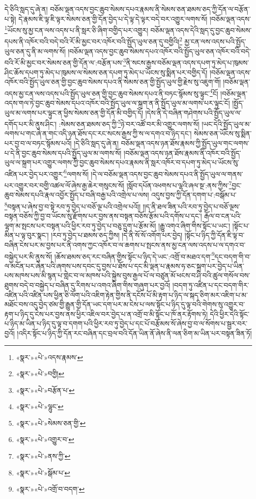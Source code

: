 དེ་ཅིའི་སླད་དུ་ཞེ་ན། བཅོམ་ལྡན་འདས་བྱང་ཆུབ་སེམས་དཔའ་རྣམས་ནི་སེམས་ཅན་ཐམས་ཅད་ཀྱི་དོན་ལ་བརྩོན་པ་སྟེ། དེ་རྣམས་ཇི་ལྟ་ཇི་ལྟར་སེམས་ཅན་གྱི་དོན་བྱེད་པ་དེ་ལྟ་དེ་ལྟར་བདེ་བར་འགྱུར་ལགས་སོ། །བཅོམ་ལྡན་འདས་\footnote{«སྣར་»«པེ་»འདས་རྣམས་}ཡོངས་སུ་མྱ་ངན་ལས་འདས་པ་ནི་སླར་ཅི་ཞིག་བགྱིད་པར་འགྱུར། བཅོམ་ལྡན་འདས་དེའི་སླད་དུ་བྱང་ཆུབ་སེམས་དཔས་ནི་འཁོར་བའི་བདེ་བའི་རོ་མི་མྱང་བར་འཁོར་བའི་སྤྱོད་ཡུལ་ཅན་དུ་བགྱིའི།\footnote{«སྣར་»«པེ་»བགྱི།} མྱ་ངན་ལས་འདས་པའི་སྤྱོད་ཡུལ་ཅན་དུ་ནི་མ་ལགས་སོ། །བཅོམ་ལྡན་འདས་བྱང་ཆུབ་སེམས་དཔའ་འཁོར་བའི་སྤྱོད་ཡུལ་ཅན་འཁོར་བའི་བདེ་བའི་རོ་མི་མྱང་བར་སེམས་ཅན་གྱི་དོན་ལ་:བརྩོན་པས་\footnote{«སྣར་»«པེ་»བརྩོན་པ་}ནི་སངས་རྒྱས་བཅོམ་ལྡན་འདས་དཔག་ཏུ་མེད་པ་ཁུམས་ཤིང་ཆོས་དཔག་ཏུ་མེད་པ་ཁུམས་ལ་སེམས་ཅན་དཔག་ཏུ་མེད་པ་ཡོངས་སུ་སྨིན་པར་བགྱིད་དོ། །བཅོམ་ལྡན་འདས་འཁོར་བའི་སྤྱོད་ཡུལ་ཅན་གྱི་བྱང་ཆུབ་སེམས་དཔའ་ནི་སེམས་ཅན་གྱི་སྤྱོད་ཡུལ་གྱི་རྗེས་སུ་འཇུག་གོ། །བཅོམ་ལྡན་འདས་མྱ་ངན་ལས་འདས་པའི་སྤྱོད་ཡུལ་ཅན་གྱི་བྱང་ཆུབ་སེམས་དཔའ་ནི་བཏང་སྙོམས་སུ་ལྟུང་\footnote{«སྣར་»«པེ་»ལྷུང་}ངོ། །བཅོམ་ལྡན་འདས་གལ་ཏེ་བྱང་ཆུབ་སེམས་དཔའ་འཁོར་བའི་སྤྱོད་ཡུལ་ལ་སྐྲག་ན་ནི་སྤྱོད་ཡུལ་མ་ལགས་པར་ལྟུང་ངོ། །སྤྱོད་ཡུལ་མ་ལགས་པར་ལྟུང་ན་ཕྱིས་སེམས་ཅན་གྱི་དོན་མི་བགྱིད་དོ། །དེས་ནི་དེ་བཞིན་གཤེགས་པའི་སྤྱོད་ཡུལ་ལ་དགོད་པར་མི་ནུས་ཤིང་། :སེམས་ཅན་ཐམས་ཅད་ཀྱི་\footnote{«སྣར་»«པེ་»སེམས་ཅན་གྱི་}ཉེ་བར་འཚོ་བར་མི་འགྱུར་ལགས་སོ། །ཡང་དེའི་སྤྱོད་ཡུལ་མ་ལགས་པ་གང་ཞེ་ན་གང་འདི་ཉན་ཐོས་དང་རང་སངས་རྒྱས་ཀྱི་ས་ལ་དགའ་བ་ཉིད་དང་། སེམས་ཅན་ཡོངས་སུ་སྨིན་པར་བྱ་བ་ལ་བཏང་སྙོམས་པའོ། །དེ་ཅིའི་སླད་དུ་ཞེ་ན། བཅོམ་ལྡན་འདས་ཉན་ཐོས་རྣམས་ཀྱི་སྤྱོད་ཡུལ་གང་ལགས་པ་དེ་ནི་བྱང་ཆུབ་སེམས་དཔའི་སྤྱོད་ཡུལ་མ་ལགས་སོ། །བཅོམ་ལྡན་འདས་ཉན་ཐོས་རྣམས་ནི་འཁོར་བའི་སྤྱོད་ཡུལ་ལ་སྐྲག་པར་འགྱུར་ལགས་ཀྱི་བྱང་ཆུབ་སེམས་དཔའ་རྣམས་ནི་སླར་འཁོར་བ་དཔག་ཏུ་མེད་པ་ཡོངས་སུ་འཛིན་པར་བྱེད་པར་འགྱུར་\footnote{«སྣར་»«པེ་»འགྱུར་བ་}ལགས་སོ། །དེ་ལ་བཅོམ་ལྡན་འདས་བྱང་ཆུབ་སེམས་དཔའ་ནི་སྤྱོད་ཡུལ་ལ་གནས་པར་འགྱུར་བར་བགྱི་འཚལ་ལོ་ཞེས་རྒྱ་ཆེར་གསུངས་སོ། །སློབ་དཔོན་འཕགས་པ་ལྷའི་ཞལ་སྔ་:ནས་ཀྱིས་\footnote{«སྣར་»«པེ་»ནས་ཀྱི་}བྱང་ཆུབ་སེམས་དཔའི་རྣལ་འབྱོར་སྤྱོད་པ་བཞི་བརྒྱ་པའི་འགྲེལ་པ་ལས། འདུས་བྱས་ཀྱི་དོན་དགག་པ་:བསྒོམ་པ་\footnote{«སྣར་»«པེ་»སྒོམ་པ་}བསྟན་པ་ཞེས་བྱ་བ་སྟེ་རབ་ཏུ་བྱེད་པ་བཅོ་ལྔ་པའི་འགྲེལ་པའོ།། །།ད་ནི་ཐལ་ཟིན་པའི་རབ་ཏུ་བྱེད་པ་བཅོ་ལྔས་བསྟན་བཅོས་ཀྱི་བྱ་བ་ཡོངས་སུ་རྫོགས་པར་བྱས་ནས་བསྟན་བཅོས་རྩོམ་པའི་དགོས་པ་དང་། རྒོལ་བ་ངན་པའི་ལྷག་མ་སྤངས་པར་བསྟན་པའི་ཕྱིར་རབ་ཏུ་བྱེད་པ་བཅུ་དྲུག་པ་རྩོམ་མོ། །རྒྱུ་འགའ་ཞིག་གིས་སྟོང་པ་ཡང་། །སྟོང་པ་མིན་པ་ལྟ་བུར་སྣང་། །རབ་ཏུ་བྱེད་པ་ཐམས་ཅད་ཀྱིས། །དེ་ནི་སོ་སོ་འགོག་པར་བྱེད། །སྟོང་པ་ཉིད་ཀྱི་དོན་ཇི་ལྟ་བ་བཞིན་ངེས་པར་མ་བྱས་པར་ནི་འགས་ཀྱང་འཁོར་བ་ལ་ཆགས་པ་སྤངས་ནས་མྱ་ངན་ལས་འདས་པ་ལ་དགའ་བ་བསྐྱེད་པར་མི་ནུས་སོ། །ཆོས་ཐམས་ཅད་རང་བཞིན་གྱིས་སྟོང་པ་ཉིད་དེ་ཡང་:འགྲོ་བ་མཐའ་དག་\footnote{«སྣར་»«པེ་»འགྲོ་བ་བདག་}དང་བདག་གི་བ་ལ་མངོན་པར་ཞེན་པའི་ཞགས་པས་དབང་དུ་བྱས་པ་ཐོས་པ་དང་མི་ལྡན་པ་རྣམས་ཧ་ཅང་སྐྲག་པར་བྱེད་པ་ཡིན་པས་མཁས་པས་མི་སྙན་པ་གླེང་བ་ལ་མཁས་པའི་སྐྱེས་བུས་རྒྱལ་པོ་ལ་བཙུན་མོ་ཕངས་བ་ཤི་བའི་ཚུལ་གསོལ་བས་ཐུགས་བདེ་བ་བསྐྱེད་པ་བཞིན་དུ་རིགས་པ་འགའ་ཞིག་གིས་གཞུག་པར་བྱའོ། །བདག་ཏུ་འཛིན་པ་དང་བདག་གིར་འཛིན་པའི་འཛིན་པས་ཕྱིན་ཅི་ལོག་པའི་འཇིག་རྟེན་གྱིས་ནི་དངོས་པོ་མི་རྟག་པ་ཉིད་ལ་སྐད་ཅིག་མར་འཇིག་པ་མ་མཐོང་བས་འདུ་བྱེད་ཙམ་གྱི་རྒྱུན་གྱི་དོན་ཡང་དག་པར་མ་ངེས་པ་ལས་སྟོང་པ་ཉིད་དུ་ལྟ་བའི་གེགས་སུ་འགྱུར་བ་རྟག་པ་ཉིད་དུ་ངེས་པར་བྱས་ནས་ཕྱིར་འཇིལ་བར་བྱེད་པ་ན་འགྲོ་བ་མི་སྟོང་པ་ཁོ་ནར་རྟོགས་ཏེ། དེའི་ཕྱིར་དེའི་སྟོང་པ་ཉིད་མ་ཡིན་པ་ཉིད་དུ་ལྟ་བ་དགག་པའི་ཕྱིར་རབ་ཏུ་བྱེད་པ་དང་པོ་བརྩོམས་སོ་ཞེས་བྱ་བ་ལ་སོགས་པ་སྦྱར་བར་བྱའོ། །འདིར་སྟོང་པ་ཉིད་ཀྱི་དོན་རང་བཞིན་དང་བྲལ་བའི་དོན་ཡིན་ནོ་ཞེས་ནི་ལན་ཅིག་མ་ཡིན་པར་བསྟན་ཟིན་ཏོ། 